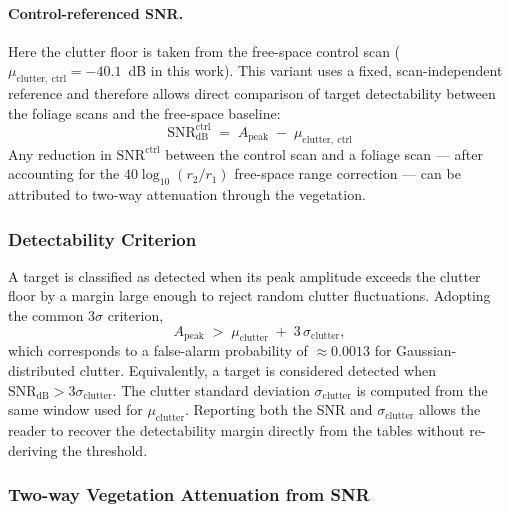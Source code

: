 \paragraph{Control-referenced SNR.}
Here the clutter floor is taken from the free-space control scan
($\mu_{\mathrm{clutter,\ ctrl}} = -40.1$~dB in this work).
This variant uses a fixed, scan-independent reference and therefore allows
direct comparison of target detectability between the foliage scans and the
free-space baseline:
\begin{equation}
    \mathrm{SNR}^{\mathrm{ctrl}}_{\mathrm{dB}}
    \;=\; A_{\mathrm{peak}} \;-\; \mu_{\mathrm{clutter,\ ctrl}}
    \label{eq:snr_ctrl}
\end{equation}
Any reduction in $\mathrm{SNR}^{\mathrm{ctrl}}$ between the control scan and a
foliage scan --- after accounting for the $40\log_{10}(r_2/r_1)$ free-space
range correction --- can be attributed to two-way attenuation through the
vegetation.

\subsubsection*{Detectability Criterion}

A target is classified as detected when its peak amplitude exceeds the
clutter floor by a margin large enough to reject random clutter fluctuations.
Adopting the common $3\sigma$ criterion,
\begin{equation}
    A_{\mathrm{peak}} \;>\; \mu_{\mathrm{clutter}} \;+\; 3\,\sigma_{\mathrm{clutter}},
    \label{eq:detect_criterion}
\end{equation}
which corresponds to a false-alarm probability of $\approx 0.0013$ for
Gaussian-distributed clutter.
Equivalently, a target is considered detected when
$\mathrm{SNR}_{\mathrm{dB}} > 3\sigma_{\mathrm{clutter}}$.
The clutter standard deviation $\sigma_{\mathrm{clutter}}$ is computed from
the same window used for $\mu_{\mathrm{clutter}}$.
Reporting both the SNR and $\sigma_{\mathrm{clutter}}$ allows the reader to
recover the detectability margin directly from the tables without re-deriving
the threshold.

\subsubsection*{Two-way Vegetation Attenuation from SNR}


